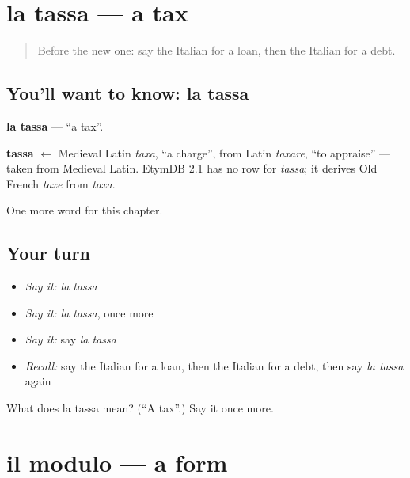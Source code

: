 \section[la tassa]{la tassa — a tax}

\label{lesson:IT-C253-tassa}



\begin{quote}
Before the new one: say the Italian for a loan, then the Italian for a debt.
\end{quote}

\subsection*{You'll want to know: la tassa}
\textbf{la tassa} — \textquotedblleft{}a tax\textquotedblright{}.

\begin{cousinweb}
\textbf{tassa} $\leftarrow$ Medieval Latin \emph{taxa}, \textquotedblleft{}a charge\textquotedblright{}, from Latin \emph{taxare}, \textquotedblleft{}to appraise\textquotedblright{} — taken from Medieval Latin. EtymDB 2.1 has no row for \emph{tassa}; it derives Old French \emph{taxe} from \emph{taxa}.
\end{cousinweb}

\begin{grammarlens}[title={What you've built}]
One more word for this chapter.
\end{grammarlens}

\subsection*{Your turn}
\begin{itemize}
\raggedright
  \item \emph{Say it:} \emph{la tassa}
  \item \emph{Say it:} \emph{la tassa}, once more
  \item \emph{Say it:} say \emph{la tassa}
  \item \emph{Recall:} say the Italian for a loan, then the Italian for a debt, then say \emph{la tassa} again
\end{itemize}

\begin{tcolorbox}[breakable,colback=teal!4,colframe=teal!35!black,title={Before you move on}]
What does la tassa mean? (\textquotedblleft{}A tax\textquotedblright{}.) Say it once more.
\end{tcolorbox}
\section[il modulo]{il modulo — a form}

